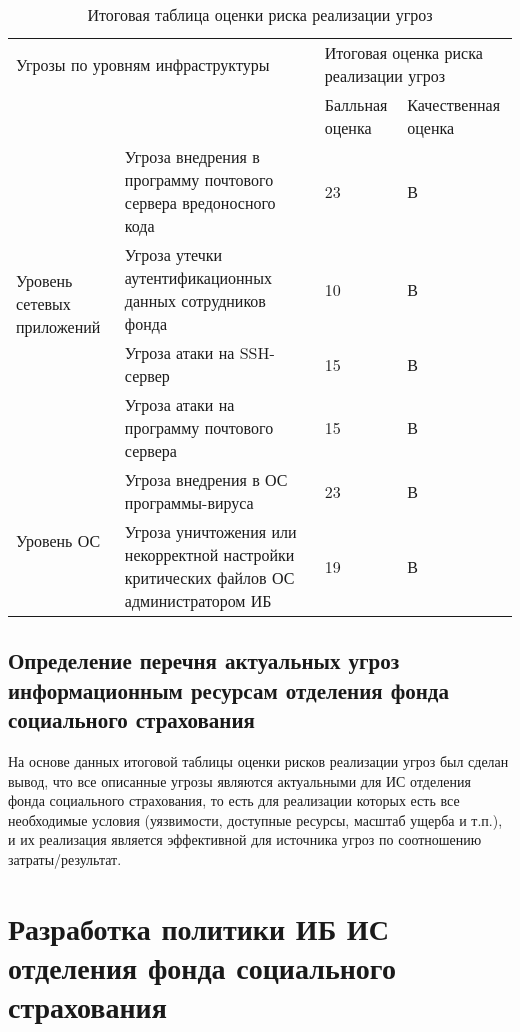 \begin{table}[h]
  \caption{Итоговая таблица оценки риска реализации угроз}
  \label{tab:itog_realiz_ugroz}
  \small
  \begin{tabular}{|p{2.5cm}|p{7.5cm}|p{2cm}|p{2cm}|}
    \hline
    \multicolumn{2}{|p{10cm}|}{Угрозы по уровням инфраструктуры} &
    \multicolumn{2}{p{4cm}|}{Итоговая оценка риска реализации угроз}
    \\\cline{3-4}
    \multicolumn{2}{|c|}{} & Балльная оценка & Качествен\-ная оценка
    \\\hline
    \multirow{4}{3cm}{Уровень сетевых приложений} &
    Угроза внедрения в программу почтового сервера вредоносного кода
    &23 & В \\\cline{2-4}
    & Угроза утечки аутентификационных данных сотрудников фонда
    &10 & В\\\cline{2-4}
    & Угроза атаки на SSH-сервер
    &15 & В\\\cline{2-4}
    & Угроза атаки на программу почтового сервера
    &15 & В\\\hline
    \multirow{4}{3cm}{Уровень ОС} &
    Угроза внедрения в ОС программы-вируса
    &23 & В\\\cline{2-4}
    & Угроза уничтожения или некорректной настройки критических файлов
    ОС администратором ИБ
    &19 & В\\\hline
  \end{tabular}
\end{table}
\normalsize

\subsection{Определение перечня актуальных угроз
  информационным ресурсам отделения фонда
  социального страхования}

На основе данных итоговой таблицы оценки рисков реализации угроз был
сделан вывод, что все описанные угрозы являются актуальными для ИС
отделения фонда социального страхования, то есть для реализации
которых есть все необходимые условия (уязвимости, доступные ресурсы,
масштаб ущерба и т.п.), и их реализация является эффективной для
источника угроз по соотношению затраты/результат.
\newpage

\section{Разработка политики ИБ ИС отделения
  фонда социального страхования }
\label{sec:3}

